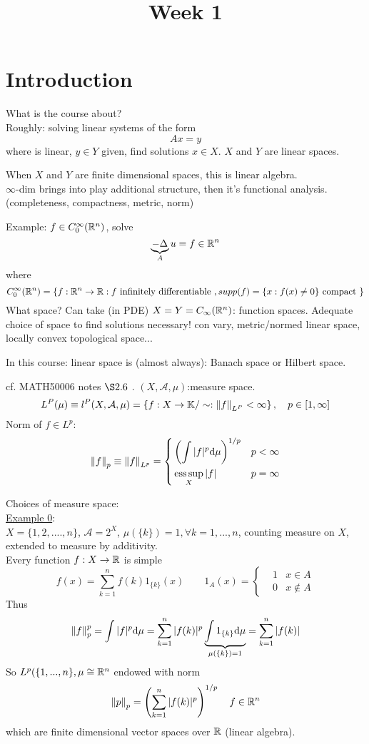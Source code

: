 \documentclass{article}
\title{Week 1}
\begin{document}
\maketitle
\section{Introduction}  

What is the course about?\\

Roughly: solving linear systems of the form
$$Ax=y$$
where  is linear, $y\in Y$ given, find solutions $x\in X$. $X$ and $Y$ are linear spaces.
\begin{remark}
	When $X$ and $Y$ are finite dimensional spaces, this is linear algebra.\\
	$\infty$-dim brings into play additional structure, then it's functional analysis. (completeness, compactness, metric, norm)
\end{remark}

Example: $f\in C_0^\infty (\mathbb{R}^n)$, solve
$$
	\underbrace{-\Delta}_A u=f\in\mathbb{R}^n
$$where
$$
	C_0^\infty(\mathbb{R}^n)=\left\{
	f:\mathbb{R}^n\to\mathbb{R}:f\text{ infinitely differentiable }, supp(f)=\{x:f(x)\neq0\} \text{ compact }
	\right\}
$$
What space?
Can take (in PDE) $X=Y=C_\infty(\mathbb{R}^n)$: function spaces.
Adequate choice of space to find solutions necessary!
con vary, metric/normed linear space, locally convex topological space...

In this course: linear space is (almost always): Banach space or Hilbert space.
\begin{example}
	cf. MATH50006 notes $\S2.6$ .
	$(X,\mathcal{A},\mu)$:measure space.
	$$
		L^P(\mu)\equiv l^P(X,\mathcal{A},\mu)=
		\left\{
		f:X\to\mathbb{K}/\sim:\left\|{f}\right\|_{L^P}<\infty
		\right\},\quad p\in[1,\infty]
	$$
	Norm of $f\in L^p$:
	$$
		\left\|{f}\right\|_p\equiv\left\|{f}\right\|_{L^p}=
		\left\{
		\begin{aligned}
			 & \left(\int|f|^p{\rm d}\mu\right)^{1/p} & p<
			\infty                                               \\
			 & \operatorname*{ess\,sup}_X |f|                          & p=\infty
		\end{aligned}\right.
	$$
\end{example}


Choices of measure space:\\
\underline{Example 0}:\\ $X=\{1,2,....,n\}$, $\mathcal{A}=2^X$, $\mu(\{k\})=1, \forall k=1,...,n$, counting measure on $X$, extended to measure by additivity.\\
Every function $f:X\to\mathbb{R}$ is simple
$$
	f(x)=\sum^n_{k=1}f(k)1_{\{k\}}(x)\qquad 1_A(x)=
	\left\{\begin{aligned}
		 & 1 & x\in A    \\
		 & 0 & x\notin A
	\end{aligned}\right.
$$
Thus
$$
	\left\|{f}\right\|_p^p=\int|f|^p{\rm d}\mu=\sum_{k=1}^n|f(k)|^p
	\underbrace{\int1_{\{k\}}{\rm d}\mu}_{\mu(\{k\})=1}
	=\sum_{k=1}^n|f(k)|
$$
So $L^p(\{1,...,n\},\mu\cong\mathbb{R}^n$ endowed with norm
$$
	\left\|{p}\right\|_p=\left(\sum_{k=1}^n|f(k)|^p\right)^{1/p}\quad f\in\mathbb{R}^n
$$
which are finite dimensional vector spaces over $\mathbb{R}$ (linear algebra).
\end{document}
